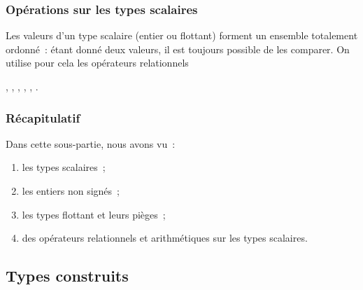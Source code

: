 \begin{frame}\frametitle{Opérations sur les types scalaires}
Les valeurs d'un type scalaire (entier ou flottant) forment un
\alert{ensemble totalement ordonné}~: étant donné deux valeurs, il est
toujours possible de les comparer. On utilise pour cela les
\alert{opérateurs relationnels}
\begin{center}
    \Code{==}, \Code{!=}, \Code{<=}, \Code{>=}, \Code{<}, \Code{>}.
\end{center}


\end{frame}

\begin{frame}[fragile] \frametitle{Récapitulatif}
Dans cette sous-partie, nous avons vu~:

\begin{enumerate}
    \item les types scalaires~;
    \smallskip

    \item les entiers non signés~;
    \smallskip

    \item les types flottant et leurs pièges~;
    \smallskip

    \item des opérateurs relationnels et arithmétiques sur les types
    scalaires.
\end{enumerate}
\end{frame}

\subsection{Types construits}

